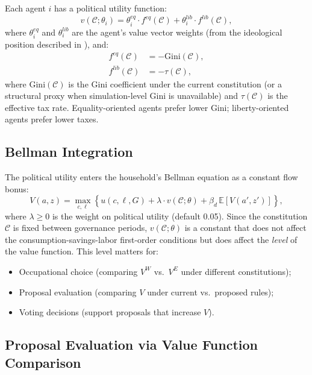 \documentclass[12pt]{article}
\newcommand{\E}{\mathbb{E}}
\newcommand{\calC}{\mathcal{C}}
\begin{document}
Each agent $i$ has a political utility function:
\begin{equation}\label{eq:political_utility}
  v(\calC; \theta_i) = \theta_i^{eq} \cdot f^{eq}(\calC) + \theta_i^{lib} \cdot f^{lib}(\calC),
\end{equation}
where $\theta_i^{eq}$ and $\theta_i^{lib}$ are the agent's value vector weights (from the ideological position described in ), and:
\begin{align}
  f^{eq}(\calC) &= -\text{Gini}(\calC), \label{eq:f_eq} \\
  f^{lib}(\calC) &= -\tau(\calC), \label{eq:f_lib}
\end{align}
where $\text{Gini}(\calC)$ is the Gini coefficient under the current constitution (or a structural proxy when simulation-level Gini is unavailable) and $\tau(\calC)$ is the effective tax rate. Equality-oriented agents prefer lower Gini; liberty-oriented agents prefer lower taxes.

\subsection{Bellman Integration}

The political utility enters the household's Bellman equation as a constant flow bonus:
\begin{equation}\label{eq:bellman_political}
  V(a, z) = \max_{c, \ell} \left\{u(c, \ell, G) + \lambda \cdot v(\calC; \theta) + \beta_d \, \E[V(a', z')]\right\},
\end{equation}
where $\lambda \geq 0$ is the weight on political utility (default 0.05). Since the constitution $\calC$ is fixed between governance periods, $v(\calC; \theta)$ is a constant that does not affect the consumption-savings-labor first-order conditions but does affect the \emph{level} of the value function. This level matters for:
\begin{itemize}
  \item Occupational choice (comparing $V^W$ vs.\ $V^E$ under different constitutions);
  \item Proposal evaluation (comparing $V$ under current vs.\ proposed rules);
  \item Voting decisions (support proposals that increase $V$).
\end{itemize}

\subsection{Proposal Evaluation via Value Function Comparison}
\end{document}
